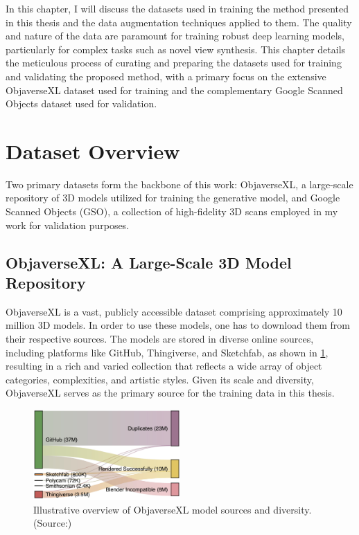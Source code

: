 \label{chapter:data-preparation}

In this chapter, I will discuss the datasets used in training the method presented in this thesis and the data augmentation techniques applied to them.
The quality and nature of the data are paramount for training robust deep learning models, particularly for complex tasks such as novel view synthesis. This chapter details the meticulous process of curating and preparing the datasets used for training and validating the proposed method, with a primary focus on the extensive ObjaverseXL dataset used for training and the complementary Google Scanned Objects dataset used for validation.

\section{Dataset Overview}\label{sec:dataset-overview}

Two primary datasets form the backbone of this work: ObjaverseXL, a large-scale repository of 3D models utilized for training the generative model, and Google Scanned Objects (GSO), a collection of high-fidelity 3D scans employed in my work for validation purposes.

\subsection{ObjaverseXL: A Large-Scale 3D Model Repository}\label{ssec:objaversexl-overview}
ObjaverseXL \cite{objaversexl} is a vast, publicly accessible dataset comprising approximately 10 million 3D models. In order to use these models, one has to download them from their respective sources. The models are stored in diverse online sources, including platforms like GitHub, Thingiverse, and Sketchfab, as shown in \ref{fig:objaversexl-overview}, resulting in a rich and varied collection that reflects a wide array of object categories, complexities, and artistic styles. Given its scale and diversity, ObjaverseXL serves as the primary source for the training data in this thesis.

\begin{figure}[h]
  \centering
  \includegraphics[width=0.5\textwidth]{images/data/sankey-diagram-objaverse-sources.jpeg}
  \caption{Illustrative overview of ObjaverseXL model sources and diversity. (Source:\cite{objaversexl})}
  \label{fig:objaversexl-overview}
\end{figure}

